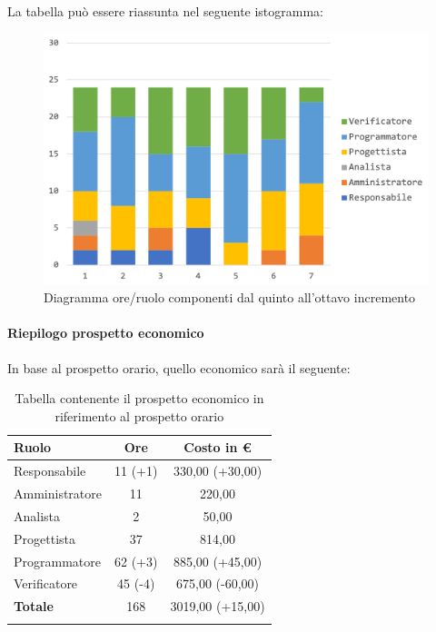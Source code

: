 		La tabella può essere riassunta nel seguente istogramma:
		\begin{figure}[H]
			\centering
			\includegraphics[width=0.8\linewidth]{./images/consuntivo/ConsIncr5-8-1.png}
			\caption{Diagramma ore/ruolo componenti dal quinto all'ottavo incremento}
			\label{fig:diagramma suddivione ruoli incrementi V-VIII}
		\end{figure}
		
		\paragraph{Riepilogo prospetto economico}
		In base al prospetto orario, quello economico sarà il seguente: 
		
		\begin{longtable}{|l|c|c|}
			\hline
			\rowcolor{lighter-grayer}
			\textbf{Ruolo} & \textbf{Ore} & \textbf{Costo in € } \\
			\hline
			\endfirsthead
			
			\hline
			Responsabile 	    & 11 (+1) & 330,00 (+30,00)\\
			\hline 
			\hline
			Amministratore	   & 11 & 220,00\\
			\hline
			\hline
			Analista 				& 2 & 50,00\\
			\hline
			\hline
			Progettista 		   & 37 & 814,00\\
			\hline
			\hline
			Programmatore 	  & 62 (+3) & 885,00 (+45,00)\\
			\hline
			\hline
			Verificatore 		   & 45 (-4) & 675,00 (-60,00)\\
			\hline
			\textbf{Totale} 	 & 168 & 3019,00 (+15,00)\\
			\hline
			\caption{Tabella contenente il prospetto economico in riferimento al prospetto orario}
		\end{longtable}
		
